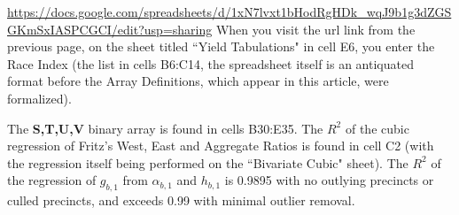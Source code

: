 \url{https://docs.google.com/spreadsheets/d/1xN7lvxt1bHodRgHDk_wqJ9b1g3dZGSGKmSxIASPCGCI/edit?usp=sharing}
\newpage
When you visit the url link from the previous page, on the sheet titled ``Yield Tabulations" in cell E6, you enter the Race Index (the list in cells B6:C14, the spreadsheet itself is an antiquated format before the Array Definitions, which appear in this article, were formalized). 

The \textbf{S,T,U,V} binary array is found in cells B30:E35. The $R^2$ of the cubic regression of Fritz's West, East and Aggregate Ratios is found in cell C2 (with the regression itself being performed on the ``Bivariate Cubic" sheet). The $R^2$ of the regression of $g_{b,1}$ from $\alpha_{b,1}$ and $h_{b,1}$ is 0.9895 with no outlying precincts or culled precincts, and exceeds 0.99 with minimal outlier removal.

